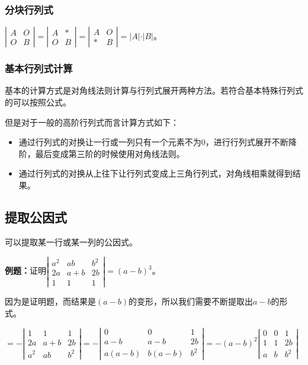 \documentclass[UTF8, 12pt]{ctexart}
\begin{document}
\subsubsection{分块行列式}

$\left|\begin{array}{cc}
    A & O \\
    O & B
\end{array}\right|=
\left|\begin{array}{cc}
    A & * \\
    O & B
\end{array}\right|=
\left|\begin{array}{cc}
    A & O \\
    * & B
\end{array}\right|=\vert A\vert\cdot\vert B\vert$。

\subsubsection{基本行列式计算}

基本的计算方式是对角线法则计算与行列式展开两种方法。若符合基本特殊行列式的可以按照公式。

但是对于一般的高阶行列式而言计算方式如下：

\begin{itemize}
    \item 通过行列式的对换让一行或一列只有一个元素不为0，进行行列式展开不断降阶，最后变成第三阶的时候使用对角线法则。
    \item 通过行列式的对换从上往下让行列式变成上三角行列式，对角线相乘就得到结果。
\end{itemize}

\subsection{提取公因式}

可以提取某一行或某一列的公因式。

\textbf{例题：}证明$\left|\begin{array}{ccc} 
    a^2 & ab & b^2 \\
    2a & a+b & 2b \\
    1 & 1 & 1
\end{array}\right|=(a-b)^3$。

因为是证明题，而结果是$(a-b)$的变形，所以我们需要不断提取出$a-b$的形式。

$=-\left|\begin{array}{ccc} 
    1 & 1 & 1 \\
    2a & a+b & 2b \\
    a^2 & ab & b^2
\end{array}\right|
=-\left|\begin{array}{ccc} 
    0 & 0 & 1 \\
    a-b & a-b & 2b \\
    a(a-b) & b(a-b) & b^2
\end{array}\right|
=-(a-b)^2\left|\begin{array}{ccc} 
    0 & 0 & 1 \\
    1 & 1 & 2b \\
    a & b & b^2
\end{array}\right|$
\end{document}
